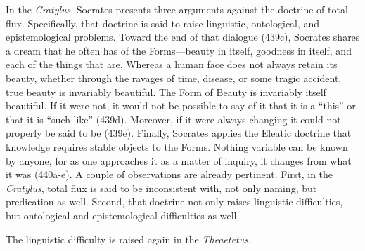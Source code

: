 In the \emph{Cratylus}, Socrates presents three arguments against the doctrine of total flux. Specifically, that doctrine is said to raise linguistic, ontological, and epistemological problems. Toward the end of that dialogue (439c), Socrates shares a dream that he often has of the Forms---beauty in itself, goodness in itself, and each of the things that are. Whereas a human face does not always retain its beauty, whether through the ravages of time, disease, or some tragic accident, true beauty is invariably beautiful. The Form of Beauty is invariably itself beautiful. If it were not, it would not be possible to say of it that it is a ``this'' or that it is ``such-like'' (439d). Moreover, if it were always changing it could not properly be said to be (439e). Finally, Socrates applies the Eleatic doctrine that knowledge requires stable objects to the Forms. Nothing variable can be known by anyone, for as one approaches it as a matter of inquiry, it changes from what it was (440a-e). A couple of observations are already pertinent. First, in the \emph{Cratylus}, total flux is said to be inconsistent with, not only naming, but predication as well. Second, that doctrine not only raises linguistic difficulties, but ontological and epistemological difficulties as well.

The linguistic difficulty is raised again in the \emph{Theaetetus}. 



